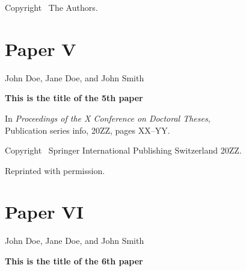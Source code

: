 \documentclass[officiallayout]{tktla}
\begin{document}
\vspace{60pt}
\noindent Copyright \textcopyright\ The Authors.

\cleardoublepage
%

 
\chapter*{Paper V}\thispagestyle{empty}


\vspace{80pt}
John Doe, Jane Doe, and John Smith

\vspace{10pt}
\noindent\textbf{This is the title of the 5th paper}

\vspace{10pt}
\noindent
In \emph{Proceedings of the X Conference on Doctoral Theses}, 
\\Publication series info, 20ZZ, pages XX--YY.

\vspace{60pt}
\noindent Copyright \textcopyright\ Springer International Publishing Switzerland 20ZZ. 

\noindent Reprinted with permission.

\cleardoublepage
%


\chapter*{Paper VI}\thispagestyle{empty}


\vspace{80pt}
John Doe, Jane Doe, and John Smith

\vspace{10pt}
\noindent\textbf{This is the title of the 6th paper}
\end{document}
